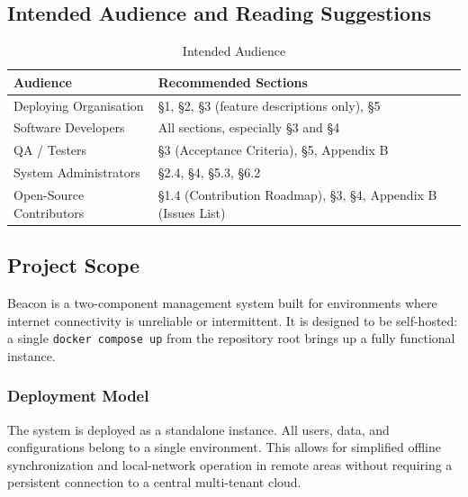 \documentclass[12pt, a4paper]{article}
\begin{document}
\newpage

\subsection{Intended Audience and Reading Suggestions}
\begin{table}[h!]
    \centering
    \caption{Intended Audience}
    \label{tab:audience}
    \begin{tabularx}{\linewidth}{@{} l X @{}}
        \toprule
        \textbf{Audience}           & \textbf{Recommended Sections} \\
        \midrule
        Deploying Organisation      & \S1, \S2, \S3 (feature descriptions only), \S5 \\
        Software Developers         & All sections, especially \S3 and \S4 \\
        QA / Testers                & \S3 (Acceptance Criteria), \S5, Appendix B \\
        System Administrators       & \S2.4, \S4, \S5.3, \S6.2 \\
        Open-Source Contributors    & \S1.4 (Contribution Roadmap), \S3, \S4,
                                      Appendix B (Issues List) \\
        \bottomrule
    \end{tabularx}
\end{table}

\subsection{Project Scope}
\label{sec:scope}

Beacon is a two-component management system built for environments where
internet connectivity is unreliable or intermittent. It is designed to be
self-hosted: a single \texttt{docker compose up} from the repository root
brings up a fully functional instance.

\subsubsection*{Deployment Model}
\begin{description}[leftmargin=3.5cm, style=nextline]
    \item[Single-Tenant (Self-Hosted)]
        The system is deployed as a standalone instance. All users, data, and configurations belong to a single environment. This allows for simplified offline synchronization and local-network operation in remote areas without requiring a persistent connection to a central multi-tenant cloud.
\end{description}
\end{document}
